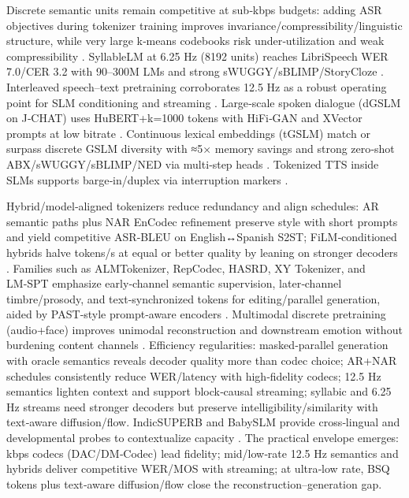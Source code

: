 \documentclass{article}
\begin{document}
Discrete semantic units remain competitive at sub‑kbps budgets: adding ASR objectives during tokenizer training improves invariance/compressibility/linguistic structure, while very large k‑means codebooks risk under‑utilization and weak compressibility \cite{vashishth2024stabspeechtokenizerassessmentbenchmark}. SyllableLM at 6.25 Hz (8192 units) reaches LibriSpeech WER 7.0/CER 3.2 with 90–300M LMs and strong sWUGGY/sBLIMP/StoryCloze \cite{baade2024syllablelmlearningcoarsesemanticunitsspe}. Interleaved speech–text pretraining corroborates 12.5 Hz as a robust operating point for SLM conditioning and streaming \cite{zeng2024scalingspeechtextpretrainingsyntheticint}. Large‑scale spoken dialogue (dGSLM on J‑CHAT) uses HuBERT+k=1000 tokens with HiFi‑GAN and XVector prompts at low bitrate \cite{nakata2024jchatjapaneselargescalespokendialoguecor}. Continuous lexical embeddings (tGSLM) match or surpass discrete GSLM diversity with ≈5× memory savings and strong zero‑shot ABX/sWUGGY/sBLIMP/NED via multi‑step heads \cite{algayres2023generativespokenlanguagemodelbasedcontin}. Tokenized TTS inside SLMs supports barge‑in/duplex via interruption markers \cite{ma2024languagemodelcanlistenwhilespeaking}.

Hybrid/model‑aligned tokenizers reduce redundancy and align schedules: AR semantic paths plus NAR EnCodec refinement preserve style with short prompts and yield competitive ASR‑BLEU on English↔Spanish S2ST; FiLM‑conditioned hybrids halve tokens/s at equal or better quality by leaning on stronger decoders \cite{peng2024mslms2stmultitaskspeechlanguagemodeltext,yang2025diffsoundstreamefficientspeechtokenizati}. Families such as ALMTokenizer, RepCodec, HASRD, XY Tokenizer, and LM‑SPT emphasize early‑channel semantic supervision, later‑channel timbre/prosody, and text‑synchronized tokens for editing/parallel generation, aided by PAST‑style prompt‑aware encoders \cite{guo2025recentadvancesdiscretespeechtokensreview}. Multimodal discrete pretraining (audio+face) improves unimodal reconstruction and downstream emotion without burdening content channels \cite{sadok2025vectorquantizedmaskedautoencoderaudiovis}. Efficiency regularities: masked‑parallel generation with oracle semantics reveals decoder quality more than codec choice; AR+NAR schedules consistently reduce WER/latency with high‑fidelity codecs; 12.5 Hz semantics lighten context and support block‑causal streaming; syllabic and 6.25 Hz streams need stronger decoders but preserve intelligibility/similarity with text‑aware diffusion/flow. IndicSUPERB and BabySLM provide cross‑lingual and developmental probes to contextualize capacity \cite{fily2024establishingdegreesclosenessbetweenaudio,lavechin2023babyslmlanguageacquisitionfriendlybenchm,entry2025indicsuperbspeechprocessinguniversalperf}. The practical envelope emerges: kbps codecs (DAC/DM‑Codec) lead fidelity; mid/low‑rate 12.5 Hz semantics and hybrids deliver competitive WER/MOS with streaming; at ultra‑low rate, BSQ tokens plus text‑aware diffusion/flow close the reconstruction–generation gap.
\end{document}

